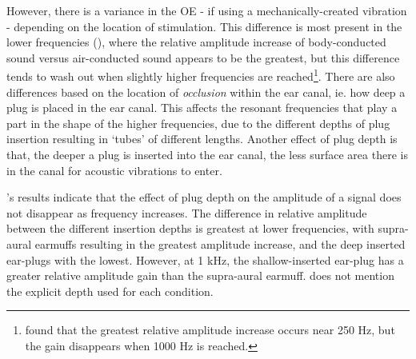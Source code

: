 However, there is a variance in the OE - if using a mechanically-created vibration - depending on the location of stimulation.  This difference is most present in the lower frequencies (\cite{dean:00}), where the relative amplitude increase of body-conducted sound versus air-conducted sound appears to be the greatest, but this difference tends to wash out when slightly higher frequencies are reached\footnote{\cite{dean:00} found that the greatest relative amplitude increase occurs near 250 Hz, but the gain disappears when 1000 Hz is reached.}.  There are also differences based on the location of \textit{occlusion} within the ear canal, ie. how deep a plug is placed in the ear canal.  This affects the resonant frequencies that play a part in the shape of the higher frequencies, due to the different depths of plug insertion resulting in `tubes' of different lengths.  Another effect of plug depth is that, the deeper a plug is inserted into the ear canal, the less surface area there is in the canal for acoustic vibrations to enter.  

\cite{dean:00}'s results indicate that the effect of plug depth on the amplitude of a signal does not disappear as frequency increases. The difference in relative amplitude between the different insertion depths is greatest at lower frequencies, with supra-aural earmuffs resulting in the greatest amplitude increase, and the deep inserted ear-plugs with the lowest.  However, at 1 kHz, the shallow-inserted ear-plug has a greater relative amplitude gain than the supra-aural earmuff.  \cite{dean:00} does not mention the explicit depth used for each condition. 


